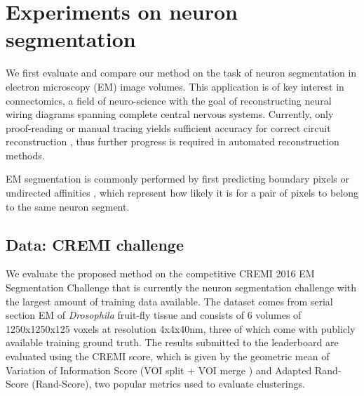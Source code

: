 
\section{Experiments on neuron segmentation}
We first evaluate and compare our method on the task of neuron segmentation in electron microscopy (EM) image volumes. This application is of key interest in connectomics, a field of neuro-science with the goal of reconstructing neural wiring diagrams spanning complete central nervous systems. Currently, only proof-reading or manual tracing yields sufficient accuracy for correct circuit reconstruction \cite{schlegel2017learning}, thus further progress is required in automated reconstruction methods.

EM segmentation is commonly performed by first predicting 
boundary pixels \cite{beier2017multicut,ciresan2012deep} or undirected affinities \cite{wolf2018mutex,lee2017superhuman,funke2018large}, which represent how likely it is for a pair of pixels to belong to the same neuron segment. 


\subsection{Data: CREMI challenge} \label{sec:cremi_challenge}
We evaluate the proposed method on the competitive CREMI 2016 EM Segmentation Challenge \cite{cremiChallenge} that is currently the neuron segmentation challenge with the largest amount of training data available. The dataset comes from serial section EM of \emph{Drosophila} fruit-fly tissue and consists of 6 volumes of 1250x1250x125 voxels at resolution 4x4x40nm, three of which come with publicly available training ground truth. The results submitted to the leaderboard are evaluated using the CREMI score, which is given by the geometric mean of Variation of Information Score (VOI split + VOI merge \cite{arganda2015crowdsourcing}) and Adapted Rand-Score (Rand-Score), two popular metrics used to evaluate clusterings.\\

